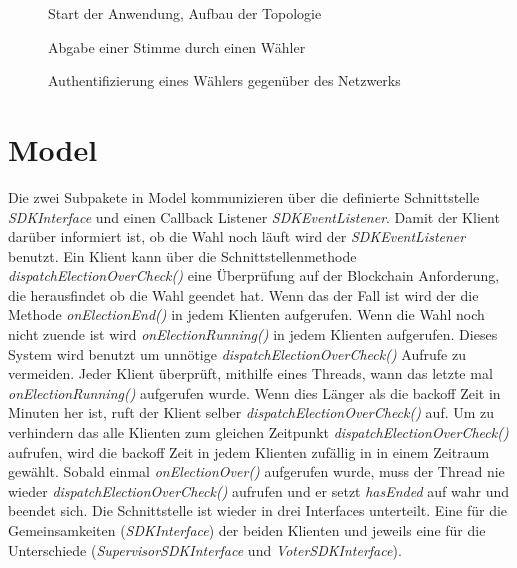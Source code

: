 \documentclass[parskip=full]{scrartcl}
\newcommand{\textitx}[1]{\mbox{\textit{#1}}}
\begin{document}
	\newpage
	\pagestyle{empty}
		\begin{figure}
		\centering
		\hspace{-100pt}
		\centerline{}
		\caption{Start der Anwendung, Aufbau der Topologie}
		\label{fig:main_thread}
	\end{figure}
	\newpage
	\begin{figure}
		\centering
		\hspace{-100pt}
		\centerline{}
		\caption{Abgabe einer Stimme durch einen Wähler}
		\label{fig:vote_sequence}
	\end{figure}

\newpage
	\begin{figure}
	\centering
	\hspace{-100pt}
	\centerline{}
	\caption{Authentifizierung eines Wählers gegenüber des Netzwerks}
	\label{fig:voter_auth}
\end{figure}
	
	\newpage
	\section{Model}
	\pagestyle{plain}
	Die zwei Subpakete in Model kommunizieren über die definierte Schnittstelle \textitx{SDKInterface} und einen Callback Listener \textitx{SDKEventListener}. 
	Damit der Klient darüber informiert ist, ob die Wahl noch läuft wird der \textitx{SDKEventListener} benutzt. Ein Klient kann über die Schnittstellenmethode \textitx{dispatchElectionOverCheck()} eine Überprüfung auf der Blockchain Anforderung, die herausfindet ob die Wahl geendet hat. Wenn das der Fall ist wird der die Methode \textitx{onElectionEnd()} in jedem Klienten aufgerufen. Wenn die Wahl noch nicht zuende ist wird \textitx{onElectionRunning()} in jedem Klienten aufgerufen. Dieses System wird benutzt um unnötige \textitx{dispatchElectionOverCheck()} Aufrufe zu vermeiden. Jeder Klient überprüft, mithilfe eines Threads, wann das letzte mal \textitx{onElectionRunning()} aufgerufen wurde. Wenn dies Länger als die backoff Zeit in Minuten her ist, ruft der Klient selber \textitx{dispatchElectionOverCheck()} auf. Um zu verhindern das alle Klienten zum gleichen Zeitpunkt \textitx{dispatchElectionOverCheck()} aufrufen, wird die backoff Zeit in jedem Klienten zufällig in in einem Zeitraum gewählt. Sobald einmal \textitx{onElectionOver()} aufgerufen wurde, muss der Thread nie wieder \textitx{dispatchElectionOverCheck()} aufrufen und er setzt \textitx{hasEnded} auf wahr und beendet sich.
	Die Schnittstelle ist wieder in drei Interfaces unterteilt. Eine für die Gemeinsamkeiten (\textitx{SDKInterface}) der beiden Klienten und jeweils eine für die Unterschiede (\textitx{SupervisorSDKInterface} und \textitx{VoterSDKInterface}).
\end{document}
